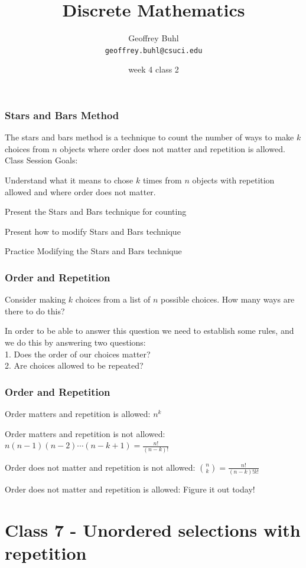 \documentclass{beamer}
\title{Discrete Mathematics}
\author[Geoffrey Buhl]{Geoffrey Buhl \\ \texttt{geoffrey.buhl@csuci.edu}}
\institute[CSUCI]{California State University Channel Islands}
\date{week 4 class 2}
\newenvironment{packed_enum}{
\begin{enumerate}
  \setlength{\itemsep}{1pt}
  \setlength{\parskip}{0pt}
  \setlength{\parsep}{0pt}
}{\end{enumerate}}
\begin{document}


\frame
{
  \frametitle{Stars and Bars Method}

The stars and bars method is a technique to count the number of ways to make $k$ choices from $n$ objects where order does not matter and repetition is allowed.
\vfill
Class Session Goals:
\begin{packed_enum}
\item Understand what it means to chose $k$ times from $n$ objects with repetition allowed and where order does not matter.
\item Present the Stars and Bars technique for counting
\item Present how to modify Stars and Bars technique
\item Practice Modifying the Stars and Bars technique
\end{packed_enum}

}

\frame
{
  \frametitle{Order and Repetition}

Consider making $k$ choices from a list of $n$ possible choices.  How many ways are there to do this?
\vfill

In order to be able to answer this question we need to establish some rules, and we do this by answering two questions:\\
\vspace{.25cm}
1. Does the order of our choices matter?\\
\vspace{.25cm}
2. Are choices allowed to be repeated?
\vfill

}


\frame
{
  \frametitle{Order and Repetition}

Order matters and repetition is allowed: $n^k$ \vfill

Order matters and repetition is not allowed: $n(n-1)(n-2)\cdots(n-k+1)=\frac{n!}{(n-k)!}$\vfill

Order does not matter and repetition is not allowed: $\binom{n}{k}=\frac{n!}{(n-k)!k!}$\vfill

Order does not matter and repetition is allowed:  Figure it out today!

}


\section{Class 7 - Unordered selections with repetition}
\end{document}
